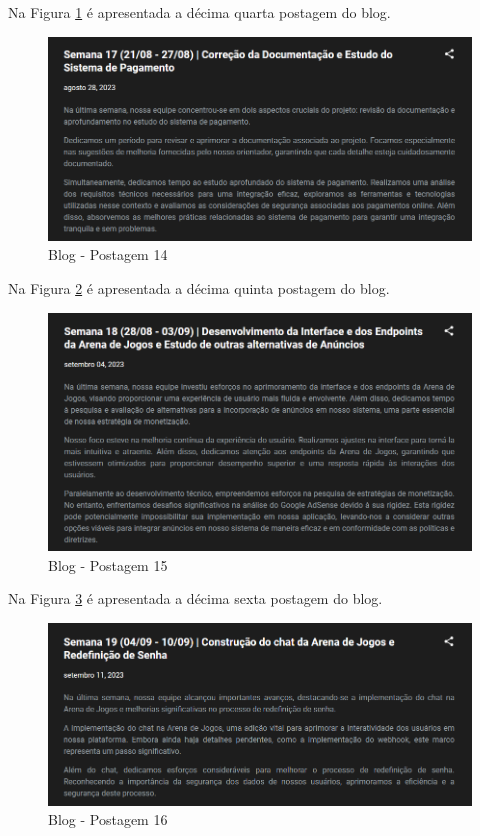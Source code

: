 \begin{apendicesenv}
Na Figura \ref{fig:122} é apresentada a décima quarta postagem do blog.

\begin{figure}[H]
	\centering
	\includegraphics[scale=0.68]{./imagens/Blog14.png}
	\caption{Blog - Postagem 14}
    \label{fig:122}
\end{figure}
\pagebreak

Na Figura \ref{fig:123} é apresentada a décima quinta postagem do blog.

\begin{figure}[H]
	\centering
	\includegraphics[scale=0.68]{./imagens/Blog15.png}
	\caption{Blog - Postagem 15}
    \label{fig:123}
\end{figure}

Na Figura \ref{fig:124} é apresentada a décima sexta postagem do blog.

\begin{figure}[H]
	\centering
	\includegraphics[scale=0.68]{./imagens/Blog16.png}
	\caption{Blog - Postagem 16}
    \label{fig:124}
\end{figure}
\pagebreak


\end{apendicesenv}

